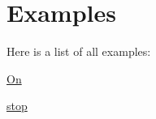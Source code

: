 \section{Examples}
Here is a list of all examples\-:\begin{DoxyCompactItemize}
\item 
\hyperlink{_on-example}{On}
\item 
\hyperlink{stop-example}{stop}
\end{DoxyCompactItemize}
